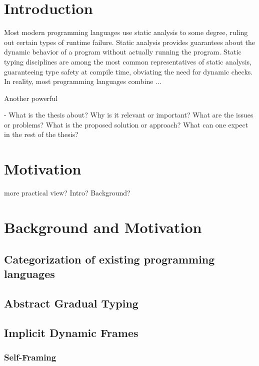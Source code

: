 
\chapter{Introduction}
Most modern programming languages use static analysis to some degree, ruling out certain types of runtime failure.
Static analysis provides guarantees about the dynamic behavior of a program without actually running the program.
Static typing disciplines are among the most common representatives of static analysis, guaranteeing type safety at compile time, obviating the need for dynamic checks.
In reality, most programming languages combine ...

Another powerful 

- 
What is the thesis about?
Why is it relevant or important?
What are the issues or problems?
What is the proposed solution or approach?
What can one expect in the rest of the thesis?


\chapter{Motivation}
more practical view? Intro? Background?


\chapter{Background and Motivation}

\section{Categorization of existing programming languages}

\section{Abstract Gradual Typing}

\section{Implicit Dynamic Frames}

\subsection{Self-Framing}

